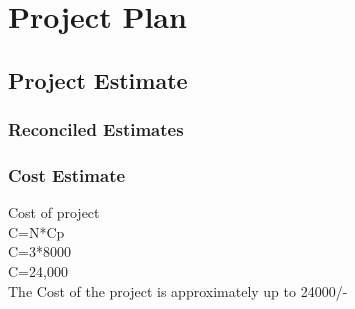 \section{Project Plan}

\subsection{Project Estimate}
\subsubsection{Reconciled Estimates}
\subsubsection{\textbf{Cost Estimate}}
Cost of project\\
C=N*Cp\\
C=3*8000\\
C=24,000\\
The Cost of the project is approximately up to 24000/-
